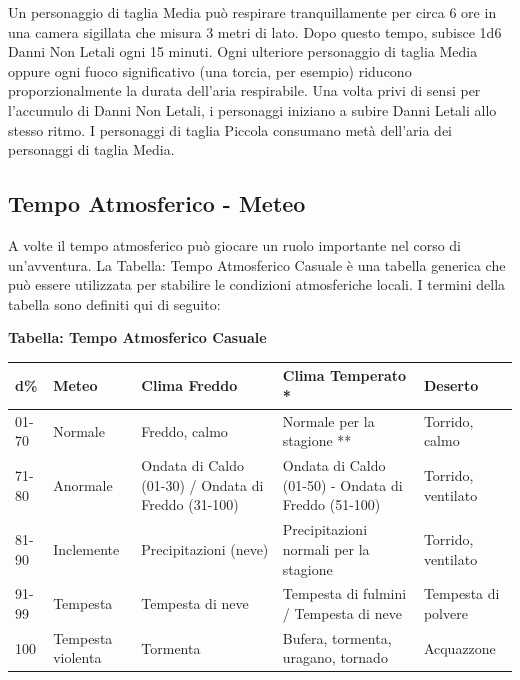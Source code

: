 \begin{multicols}{2}
Un personaggio di taglia Media può respirare tranquillamente per circa 6 ore in una camera sigillata che misura 3 metri di lato. Dopo questo tempo, subisce 1d6 Danni Non Letali ogni 15 minuti. Ogni ulteriore personaggio di taglia Media oppure ogni fuoco significativo (una torcia, per esempio) riducono proporzionalmente la durata dell'aria respirabile. Una volta privi di sensi per l'accumulo di Danni Non Letali, i personaggi iniziano a subire Danni Letali allo stesso ritmo. I personaggi di taglia Piccola consumano metà dell'aria dei personaggi di taglia Media.

\subsection{Tempo Atmosferico - Meteo}

\label{tempo-atmosferico---meteo}

A volte il tempo atmosferico può giocare un ruolo importante nel corso di un'avventura. La Tabella: Tempo Atmosferico Casuale è una tabella generica che può essere utilizzata per stabilire le condizioni atmosferiche locali. I termini della tabella sono definiti qui di seguito:

\end{multicols}

\medskip

\textbf{Tabella: Tempo Atmosferico Casuale}

\medskip

\noindent\begin{tabularx}{1\textwidth}{llXXl}
\textbf{d\%} & \textbf{Meteo} & \textbf{Clima Freddo}& \textbf{Clima Temperato {*}} & \textbf{Deserto}\\
\toprule
01-70 & Normale& Freddo, calmo & Normale per la stagione {*}{*} & Torrido, calmo\\
71-80 & Anormale & Ondata di Caldo (01-30) / Ondata di Freddo (31-100)&Ondata di Caldo (01-50) - Ondata di Freddo (51-100)& Torrido, ventilato \\
81-90 & Inclemente & Precipitazioni (neve)& Precipitazioni normali per la stagione& Torrido, ventilato \\
91-99 & Tempesta & Tempesta di neve& Tempesta di fulmini / Tempesta di neve& Tempesta di polvere \\
100& Tempesta violenta& Tormenta & Bufera, tormenta, uragano, tornado & Acquazzone
\end{tabularx}

